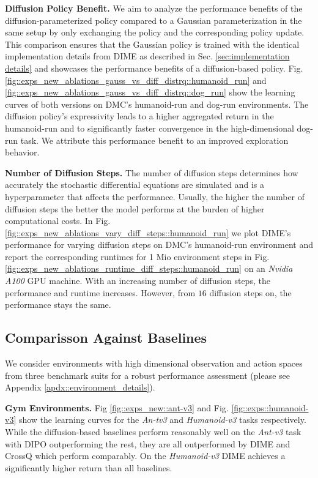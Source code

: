 \textbf{Diffusion Policy Benefit.} We aim to analyze the performance benefits of the diffusion-parameterized policy compared to a Gaussian parameterization in the same setup by only exchanging the policy and the corresponding policy update. This comparison ensures that the Gaussian policy is trained with the identical implementation details from DIME as described in Sec. \ref{sec:implementation details} and showcases the performance benefits of a diffusion-based policy. Fig. \ref{fig::exps_new_ablations_gauss_vs_diff_distrq::humanoid_run} and  \ref{fig::exps_new_ablations_gauss_vs_diff_distrq::dog_run} show the learning curves of both versions on DMC's humanoid-run and dog-run environments. The diffusion policy's expressivity leads to a higher aggregated return in the humanoid-run and to significantly faster convergence in the high-dimensional dog-run task. We attribute this performance benefit to an improved exploration behavior.  

\textbf{Number of Diffusion Steps.} The number of diffusion steps determines how accurately the stochastic differential equations are simulated and is a hyperparameter that affects the performance. Usually, the higher the number of diffusion steps the better the model performs at the burden of higher computational costs. In Fig. \ref{fig::exps_new_ablations_vary_diff_steps::humanoid_run} we plot DIME's performance for varying diffusion steps on DMC's humanoid-run environment and report the corresponding runtimes for 1 Mio environment steps in Fig. \ref{fig::exps_new_ablations_runtime_diff_steps::humanoid_run} on an \textit{Nvidia A100} GPU machine. With an increasing number of diffusion steps, the performance and runtime increases. However, from $16$ diffusion steps on, the performance stays the same.

\subsection{Comparisson Against Baselines}
We consider environments with high dimensional observation and action spaces from three benchmark suits for a robust performance assessment (please see Appendix \ref{apdx::environment_details}). 

\textbf{Gym Environments.} Fig \ref{fig::exps_new::ant-v3} and Fig. \ref{fig::exps::humanoid-v3} show the learning curves for the \textit{An-tv3} and \textit{Humanoid-v3} tasks respectively. While the diffusion-based baselines perform reasonably well on the \textit{Ant-v3} task with DIPO outperforming the rest, they are all outperformed by DIME and CrossQ which perform comparably. On the \textit{Humanoid-v3} DIME achieves a significantly higher return than all baselines.

